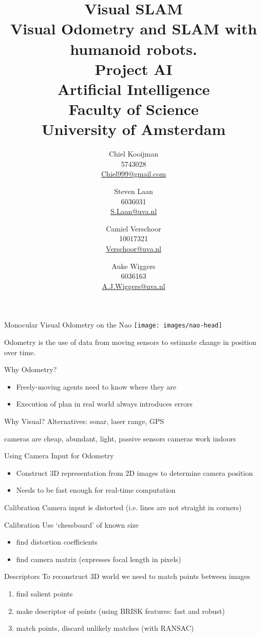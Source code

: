 \documentclass{beamer}
\author{Chiel Kooijman\\5743028\\\url{Chiel999@gmail.com} \and
Steven Laan\\6036031\\\url{S.Laan@uva.nl} \and
Camiel Verschoor\\10017321\\\url{Verschoor@uva.nl} \and
Auke Wiggers\\6036163\\\url{A.J.Wiggers@uva.nl}}
\title{Visual SLAM\\ \normalsize Visual Odometry and SLAM with humanoid
robots.\\Project AI\\Artificial Intelligence\\Faculty of Science\\ University
of Amsterdam}
\begin{document}
\begin{frame}{Monocular Visual Odometry on the Nao}
	\texttt{[image: images/nao-head]}

	Odometry is the use of data from moving sensors to estimate change in
	position over time.
\end{frame}

\begin{frame}{Why Odometry?}
	\begin{itemize}
		\item Freely-moving agents need to know where they are
		\item Execution of plan in real world always introduces errors
	\end{itemize}
\end{frame}

\begin{frame}{Why Visual?}
	Alternatives: sonar, laser range, GPS

	cameras are cheap, abundant, light, passive sensors
	cameras work indoors
\end{frame}

\begin{frame}{Using Camera Input for Odometry}
	\begin{itemize}
		\item Construct 3D representation from 2D images to determine camera
			position
		\item Needs to be fast enough for real-time computation
	\end{itemize}
\end{frame}

\begin{frame}{Calibration}
	Camera input is distorted (i.e. lines are not straight in corners)

\end{frame}

\begin{frame}{Calibration}
	Use `chessboard' of known size
	\begin{itemize}
		\item find distortion coefficients
		\item find camera matrix (expresses focal length in pixels)
	\end{itemize}

\end{frame}

\begin{frame}{Descriptors}
	To reconstruct 3D world we need to match points between images
	\begin{enumerate}
		\item find salient points
		\item make descriptor of points (using BRISK features: fast and robust)
		\item match points, discard unlikely matches (with RANSAC)
	\end{enumerate}
\end{frame}
\end{document}
